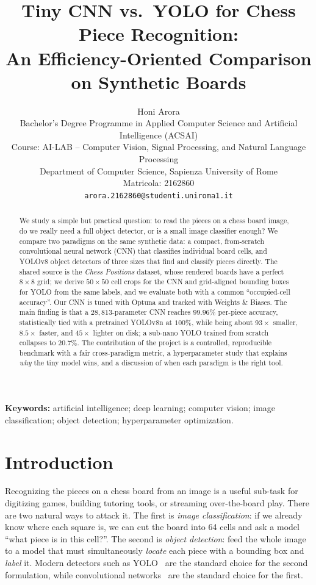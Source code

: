 \documentclass[10pt,twocolumn,a4paper]{article}
\title{\textbf{Tiny CNN vs.\ YOLO for Chess Piece Recognition:\\ An Efficiency-Oriented Comparison on Synthetic Boards}}
\author{
	Honi Arora\\
	Bachelor's Degree Programme in Applied Computer Science and Artificial Intelligence (ACSAI)\\
	Course: AI-LAB -- Computer Vision, Signal Processing, and Natural Language Processing\\
	Department of Computer Science, Sapienza University of Rome\\
	Matricola: 2162860\\
	\texttt{arora.2162860@studenti.uniroma1.it}
}
\date{}
\begin{document}
	\maketitle

	\begin{abstract}
		We study a simple but practical question: to read the pieces on a chess board image, do we really need a full object detector, or is a small image classifier enough? We compare two paradigms on the same synthetic data: a compact, from-scratch convolutional neural network (CNN) that classifies individual board cells, and YOLOv8 object detectors of three sizes that find and classify pieces directly. The shared source is the \textit{Chess Positions} dataset, whose rendered boards have a perfect $8\times8$ grid; we derive $50\times50$ cell crops for the CNN and grid-aligned bounding boxes for YOLO from the same labels, and we evaluate both with a common ``occupied-cell accuracy''. Our CNN is tuned with Optuna and tracked with Weights \& Biases. The main finding is that a $28{,}813$-parameter CNN reaches $99.96\%$ per-piece accuracy, statistically tied with a pretrained YOLOv8n at $100\%$, while being about $93\times$ smaller, $8.5\times$ faster, and $45\times$ lighter on disk; a sub-nano YOLO trained from scratch collapses to $20.7\%$. The contribution of the project is a controlled, reproducible benchmark with a fair cross-paradigm metric, a hyperparameter study that explains \emph{why} the tiny model wins, and a discussion of when each paradigm is the right tool.
	\end{abstract}

	\noindent\textbf{Keywords:} artificial intelligence; deep learning; computer vision; image classification; object detection; hyperparameter optimization.

	\section{Introduction}

	Recognizing the pieces on a chess board from an image is a useful sub-task for digitizing games, building tutoring tools, or streaming over-the-board play. There are two natural ways to attack it. The first is \emph{image classification}: if we already know where each square is, we can cut the board into 64 cells and ask a model ``what piece is in this cell?''. The second is \emph{object detection}: feed the whole image to a model that must simultaneously \emph{locate} each piece with a bounding box and \emph{label} it. Modern detectors such as YOLO~\cite{redmon2016yolo,jocher2023yolov8} are the standard choice for the second formulation, while convolutional networks~\cite{lecun2015deep,krizhevsky2012alexnet,he2016resnet} are the standard choice for the first.
\end{document}
